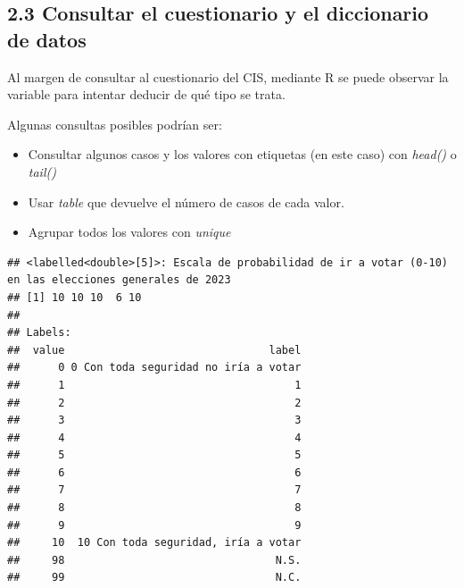 \documentclass[
]{article}
\newenvironment{Shaded}{\begin{snugshade}}{\end{snugshade}}
\newcommand{\CommentTok}[1]{\textcolor[rgb]{0.56,0.35,0.01}{\textit{#1}}}
\newcommand{\DecValTok}[1]{\textcolor[rgb]{0.00,0.00,0.81}{#1}}
\newcommand{\FunctionTok}[1]{\textcolor[rgb]{0.13,0.29,0.53}{\textbf{#1}}}
\newcommand{\NormalTok}[1]{#1}
\newcommand{\SpecialCharTok}[1]{\textcolor[rgb]{0.81,0.36,0.00}{\textbf{#1}}}
\providecommand{\tightlist}{%
  \setlength{\itemsep}{0pt}\setlength{\parskip}{0pt}}
\begin{document}
\hypertarget{consultar-el-cuestionario-y-el-diccionario-de-datos}{%
\subsection{2.3 Consultar el cuestionario y el diccionario de
datos}\label{consultar-el-cuestionario-y-el-diccionario-de-datos}}

Al margen de consultar al cuestionario del CIS, mediante R se puede
observar la variable para intentar deducir de qué tipo se trata.

Algunas consultas posibles podrían ser:

\begin{itemize}
\tightlist
\item
  Consultar algunos casos y los valores con etiquetas (en este caso) con
  \emph{head()} o \emph{tail()}
\item
  Usar \emph{table} que devuelve el número de casos de cada valor.
\item
  Agrupar todos los valores con \emph{unique}
\end{itemize}

\begin{Shaded}
\end{Shaded}

\begin{verbatim}
## <labelled<double>[5]>: Escala de probabilidad de ir a votar (0-10) en las elecciones generales de 2023
## [1] 10 10 10  6 10
## 
## Labels:
##  value                                label
##      0 0 Con toda seguridad no iría a votar
##      1                                    1
##      2                                    2
##      3                                    3
##      4                                    4
##      5                                    5
##      6                                    6
##      7                                    7
##      8                                    8
##      9                                    9
##     10  10 Con toda seguridad, iría a votar
##     98                                 N.S.
##     99                                 N.C.
\end{verbatim}

\begin{Shaded}
\end{Shaded}
\end{document}
